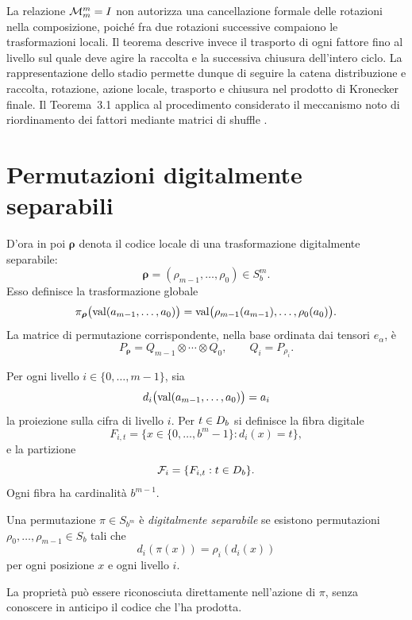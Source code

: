 	La relazione \(\mathcal M_m^m=I\) non autorizza una cancellazione formale delle
	rotazioni nella composizione, poiché fra due rotazioni successive compaiono
	le trasformazioni locali. Il teorema descrive invece il trasporto di ogni
	fattore fino al livello sul quale deve agire la raccolta e la successiva
	chiusura dell'intero ciclo.
	La rappresentazione dello stadio permette dunque di seguire la catena
	distribuzione e raccolta, rotazione, azione locale, trasporto e chiusura nel
	prodotto di Kronecker finale. Il Teorema~3.1 applica al procedimento
	considerato il meccanismo noto di riordinamento dei fattori mediante matrici
	di shuffle \cite{dangeli-donno}.

	\section{Permutazioni digitalmente separabili}

	D'ora in poi \(\boldsymbol{\rho}\) denota il codice locale di una
	trasformazione digitalmente separabile:
	\[
	\boldsymbol{\rho}
	=
	(\rho_{m-1},\dots,\rho_0)
	\in S_b^m.
	\]
	Esso definisce la trasformazione globale
	\[
	\pi_{\boldsymbol{\rho}}
	\bigl(\operatorname{val}(a_{m-1},\dots,a_0)\bigr)
	=
	\operatorname{val}\bigl(
	\rho_{m-1}(a_{m-1}),\dots,\rho_0(a_0)
	\bigr).
	\]
	La matrice di permutazione corrispondente, nella base ordinata dai tensori
	\(e_\alpha\), è
	\[
	P_{\boldsymbol{\rho}}
	=
	Q_{m-1}\otimes\cdots\otimes Q_0,
	\qquad Q_i=P_{\rho_i}.
	\]

	Per ogni livello \(i\in\{0,\dots,m-1\}\), sia
	\[
	d_i\bigl(\operatorname{val}(a_{m-1},\dots,a_0)\bigr)=a_i
	\]
	la proiezione sulla cifra di livello \(i\). Per \(t\in D_b\) si definisce la
	fibra digitale
	\[
	F_{i,t}
	=
	\{x\in\{0,\dots,b^m-1\}:d_i(x)=t\},
	\]
	e la partizione
	\[
	\mathcal F_i
	=
	\{F_{i,t}:t\in D_b\}.
	\]
	Ogni fibra ha cardinalità \(b^{m-1}\).

	\begin{definition}
		Una permutazione \(\pi\in S_{b^m}\) è \emph{digitalmente separabile} se
		esistono permutazioni \(\rho_0,\dots,\rho_{m-1}\in S_b\) tali che
		\[
		d_i(\pi(x))
		=
		\rho_i(d_i(x))
		\]
		per ogni posizione \(x\) e ogni livello \(i\).
	\end{definition}

	La proprietà può essere riconosciuta direttamente nell'azione di \(\pi\),
	senza conoscere in anticipo il codice che l'ha prodotta.


